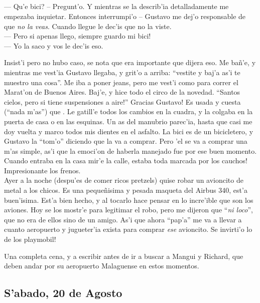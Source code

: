 \subparagraph{}\label{ssub:superBike} --- \textquestiondown Qu'e bici? --
Pregunt'o. Y mientras se la describ'ia detalladamente me empezaba inquietar.
Entonces interrumpi'o -- Gustavo me dej'o responsable de que \emph{no la veas}.
Cuando llegue le dec'is que no la viste.\\ --- \textexclamdown Pero si apenas
llego, siempre guardo mi bici!\\ --- Yo la saco y vos le dec'is eso.\\
\hangindent=1cm

Insist'i pero no hubo caso, se nota que era importante que dijera eso. Me
ba\~n'e, y mientras me vest'ia Gustavo llegaba, y grit'o a arriba: ``vestite y
baj'a as'i te muestro una cosa''. Me iba a poner jeans, pero me vest'i como para
correr el Marat'on de Buenos Aires. Baj'e, y hice todo el circo de la novedad.
``Santos cielos, \textexclamdown pero si tiene suspensiones a aire!''
\textexclamdown Gracias Gustavo! Es usada y cuesta (``nada m'as'') que
. Le gatill'e todos los cambios en la cuadra, y la colgaba
en la puerta de casa o en las esquinas. Un as del manubrio parec'ia, hasta que
casi me doy vuelta y marco todos mis dientes en el asfalto. La bici es de un
bicicletero, y Gustavo la ``tom'o'' diciendo que la va a comprar. Pero 'el se va
a comprar una m'as simple, as'i que la emoci'on de haberla manejado fue por ese
buen momento. Cuando entraba en la casa mir'e la calle, \textexclamdown
estaba toda marcada por los cauchos! Impresionante los frenos.\\

Ayer a la noche (despu'es de comer ricos pretzels) quise robar un avioncito de
metal a los chicos. Es una peque\~nisima y pesada maqueta del Airbus 340, est'a
buen'isima. Est'a bien hecho, y al tocarlo hace pensar en lo incre'ible que son
los aviones. Hoy se los mostr'e para legitimar el robo, pero me dijeron que
``\emph{ni loco}'', que no era de ellos sino de un amigo. As'i que ahora
``pap'a'' me va a llevar a cuanto aeropuerto y jugueter'ia exista para comprar
\emph{ese} avioncito. \textexclamdown Se invirti'o lo de los playmobil!

Una completa cena, y a escribir antes de ir a buscar a Mangui y Richard, que
deben andar por su aeropuerto Malaguense en estos momentos.

\subsection*{S'abado, 20 de Agosto}

